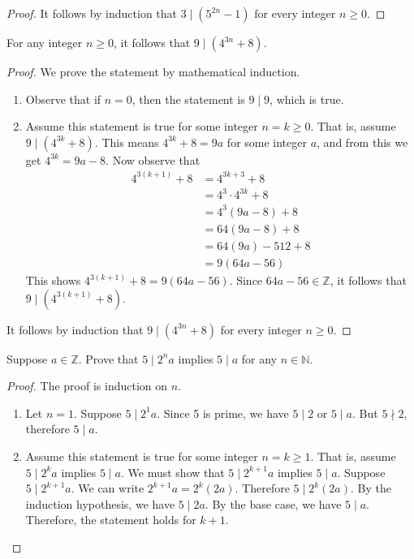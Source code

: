 \documentclass[DIN, pagenumber=false, fontsize=11pt, parskip=half]{scrartcl}
\begin{document}
\begin{problems}
\begin{proof}
        It follows by induction that $3 \mid (5^{2n}-1)$ for every integer $n \geq 0$.
    \end{proof}

    \problem For any integer $n \geq 0$, it follows that $9 \mid (4^{3n}+8)$.
    \begin{proof}
        We prove the statement by mathematical induction.
        \begin{enumerate}
            \item Observe that if $n=0$, then the statement is $9 \mid 9$, which is true.

            \item Assume this statement is true for some integer $n = k \geq 0$.
                That is, assume $9 \mid (4^{3k}+8)$.
                This means $4^{3k} + 8 = 9a$ for some integer $a$, and from this we get $4^{3k} = 9a-8$.
                Now observe that
                \begin{align*}
                    4^{3(k+1)}+8 &= 4^{3k+3}+8\\ 
                                 &= 4^3\cdot4^{3k}+8\\ 
                                 &= 4^3(9a-8)+8\\ 
                                 &= 64(9a-8)+8\\ 
                                 &= 64(9a)-512+8\\ 
                                 &= 9(64a-56)
                \end{align*}
                This shows $4^{3(k+1)}+8 = 9(64a-56)$. Since $64a-56 \in \mathbb{Z}$, it follows that $9 \mid (4^{3(k+1)}+8)$.
        \end{enumerate}

        It follows by induction that $9 \mid (4^{3n}+8)$ for every integer $n \geq 0$.
    \end{proof}

    \problem Suppose $a \in \mathbb{Z}$. Prove that $5 \mid 2^{n}a$ implies $5 \mid a$ for any $n \in \mathbb{N}$.
    \begin{proof}
        The proof is induction on $n$.
        \begin{enumerate}
            \item Let $n=1$. Suppose $5 \mid 2^{1}a$.
                Since 5 is prime, we have $5 \mid 2$ or $5 \mid a$.
                But $5 \nmid 2$, therefore $5 \mid a$.

            \item Assume this statement is true for some integer $n = k \geq 1$.
                That is, assume $5 \mid 2^{k}a$ implies $5 \mid a$.
                We must show that $5 \mid 2^{k+1}a$ implies $5 \mid a$.
                Suppose $5 \mid 2^{k+1}a$.
                We can write $2^{k+1}a = 2^{k}(2a)$.
                Therefore $5 \mid 2^{k}(2a)$.
                By the induction hypothesis, we have $5 \mid 2a$.
                By the base case, we have $5 \mid a$.
                Therefore, the statement holds for $k + 1$.
        \end{enumerate}


\end{proof}
\end{problems}
\end{document}
